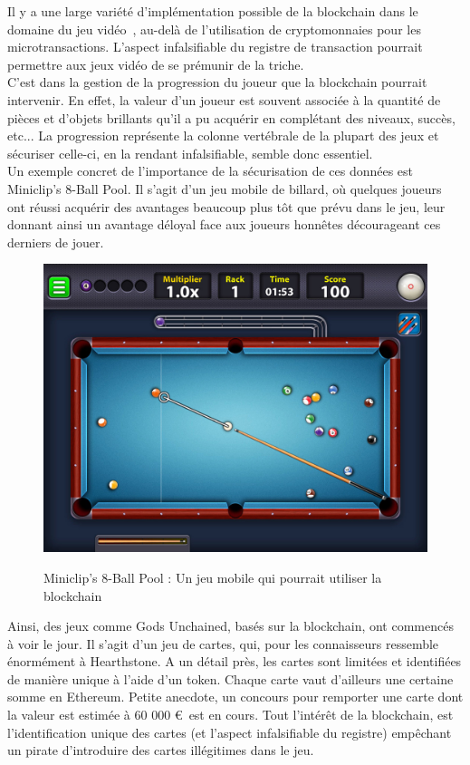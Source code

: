\documentclass[12pt, a4paper, oneside]{book}
\begin{document}
    Il y a une large variété d’implémentation possible de la blockchain dans le domaine du jeu vidéo~\cite{JV}, au-delà de l’utilisation de cryptomonnaies pour les microtransactions.  L’aspect infalsifiable du registre de transaction pourrait permettre aux jeux vidéo de se prémunir de la triche.
    \\
    C’est dans la gestion de la progression du joueur que la blockchain pourrait intervenir. En effet, la valeur d’un joueur est souvent associée à la quantité de pièces et d’objets brillants qu’il a pu acquérir en complétant des niveaux, succès, etc... La progression représente la colonne vertébrale de la plupart des jeux et sécuriser celle-ci, en la rendant infalsifiable, semble donc essentiel.
    \\
    Un exemple concret de l'importance de la sécurisation de ces données est Miniclip’s 8-Ball Pool. Il s’agit d’un jeu mobile de billard, où quelques joueurs ont réussi acquérir des avantages beaucoup plus tôt que prévu dans le jeu, leur donnant ainsi un avantage déloyal face aux joueurs honnêtes décourageant ces derniers de jouer.
    
    \begin{figure}[H]
        \begin{center}
          \includegraphics[width=.43\textwidth]{images/billard.jpg}
          \label{fig:billard}
          \caption{Miniclip’s 8-Ball Pool : Un jeu mobile qui pourrait utiliser la blockchain}
        \end{center}
    \end{figure}
    Ainsi, des jeux comme Gods Unchained, basés sur la blockchain, ont commencés à voir le jour. Il s'agit d'un jeu de cartes, qui, pour les connaisseurs ressemble énormément à Hearthstone. A un détail près, les cartes sont limitées et identifiées de manière unique à l'aide d'un token. Chaque carte vaut d'ailleurs une certaine somme en Ethereum. Petite anecdote, un concours pour remporter une carte dont la valeur est estimée à 60 000 \euro~est en cours. Tout l'intérêt de la blockchain, est l'identification unique des cartes (et l'aspect infalsifiable du registre) empêchant un pirate d'introduire des cartes illégitimes dans le jeu.
    
\end{document}
